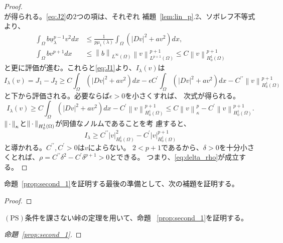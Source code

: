 \begin{proof}
\begin{equation}
 \end{equation}
 が得られる。\eqref{eq:J2}の$2$つの項は、それぞれ
 補題~\ref{lem:lin_p}.2、ソボレフ不等式より、
 \begin{align*}
  \int_\Omega b\underline{u}_\lambda^{p-1} v^2 dx &\leq
  \frac{1}{p\mu_1(\lambda)} \int_\Omega \left( \lvert Dv \rvert^2 +
  av^2 \right) dx, \\
  \int_\Omega bv^{p+1} dx &\leq \left\| b \right\|_{L^\infty(\Omega)}
  \left\| v \right\|_{L^{p+1}(\Omega)}^{p+1} \leq C \left\| v
  \right\|_{H_0^1(\Omega)}^{p+1}
 \end{align*}
 と更に評価が進む。これらと\eqref{eq:J1}より、$I_\lambda(v)$は
 \[
  I_\lambda(v) = J_1 - J_2 \geq C \int_\Omega \left( \lvert Dv
 \rvert^2 + a v^2 \right) dx - \epsilon C^\prime \int_\Omega \left(
 \lvert Dv \rvert^2 + av^2 \right) dx - C^{\prime\prime} \left\| v \right\|^{p+1}_{H_0^1(\Omega)}
 \]
 と下から評価される。必要ならば$\epsilon > 0$を小さくすれば、
 次式が得られる。
 \[
  I_\lambda (v) \geq C \int_\Omega \left( \lvert Dv \rvert^2 + av^2
 \right) dx - C^\prime \left\| v \right\|_{H_0^1(\Omega)}^{p+1} \leq C
 \left\| v \right\|_{\kappa}^p - C^\prime \left\| v
 \right\|^{p+1}_{H_0^1(\Omega)}.
 \]
 $\left\|\, \cdot \, \right\|_\kappa$と$\left\|\, \cdot \, \right\|_{H_0^1(\Omega)}$が同値なノルムであることを考
 慮すると、
 \[
  I_\lambda \geq C^{\prime\prime} \left| v \right|_{H_0^1(\Omega)}^2
 - C^{\prime} \left| v \right|_{H_0^1(\Omega)}^{p+1}
 \]
 と導かれる。$C^{\prime\prime}, C^\prime > 0$は$v$によらない。
 $2 < p+1$であるから、$\delta > 0$を十分小さくとれば、$\rho =
 C^{\prime\prime} \delta^2 - C^{\prime} \delta^{p+1} > 0$とできる。
 つまり、\eqref{eq:delta_rho}が成立する。 \qedhere
\end{proof}

命題~\ref{prop:second_1}を証明する最後の準備として、次の補題を証明する。

\begin{lem} \label{lem:mountain_dec}
 
\end{lem}

\begin{proof}
 
\end{proof}

$(\mathrm{PS})$条件を課さない峠の定理を用いて、命題
~\ref{prop:second_1}を証明する。

\begin{proof}[命題~\ref{prop:second_1}]
 
\end{proof}

